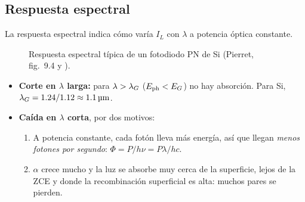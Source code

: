 \subsection{Respuesta espectral}

La respuesta espectral indica cómo varía $I_L$ con $\lambda$ a potencia óptica constante.

\begin{figure}[H]
\centering
{}
\caption{Respuesta espectral típica de un fotodiodo PN de Si (Pierret, fig.~9.4 y ).}
\label{fig:resp-espectral}
\end{figure}

\begin{itemize}
  \item \textbf{Corte en $\lambda$ larga:} para $\lambda>\lambda_G$ ($E_{\mathrm{ph}}<E_G$) no hay absorción.
  Para Si, $\lambda_G=1.24/1.12\approx\SI{1.1}{\micro m}$.
  \item \textbf{Caída en $\lambda$ corta}, por dos motivos:
  \begin{enumerate}
    \item A potencia constante, cada fotón lleva más energía, así que llegan \emph{menos
    fotones por segundo}: $\Phi = P/h\nu = P\lambda/hc$.
    \item $\alpha$ crece mucho y la luz se absorbe muy cerca de la superficie, lejos de la
    ZCE y donde la recombinación superficial es alta: muchos pares se pierden.
  \end{enumerate}
\end{itemize}

